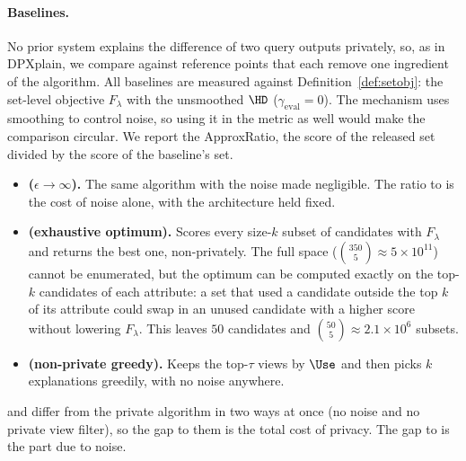 \paragraph{Baselines.}
No prior system explains the difference of two query outputs privately, so, as in DPXplain, we compare against reference points that each remove one ingredient of the algorithm.
All baselines are measured against Definition~\ref{def:setobj}: the set-level objective $F_\lambda$ with the unsmoothed $\HD$ ($\gamma_{\mathrm{eval}}=0$).
The mechanism uses smoothing to control noise, so using it in the metric as well would make the comparison circular.
We report the ApproxRatio, the score of the released set divided by the score of the baseline's set.
\begin{itemize}[leftmargin=*,itemsep=1pt,topsep=2pt]
  \item \textbf{\Bone{} ($\epsilon\to\infty$).} The same algorithm with the noise made negligible. The ratio to \Bone{} is the cost of noise alone, with the architecture held fixed.
  \item \textbf{\Btwo{} (exhaustive optimum).} Scores every size-$k$ subset of candidates with $F_\lambda$ and returns the best one, non-privately. The full space ($\binom{350}{5}\approx5\times10^{11}$) cannot be enumerated, but the optimum can be computed exactly on the top-$k$ candidates of each attribute: a set that used a candidate outside the top $k$ of its attribute could swap in an unused candidate with a higher score without lowering $F_\lambda$. This leaves $50$ candidates and $\binom{50}{5}\approx2.1\times10^{6}$ subsets.
  \item \textbf{\Bthree{} (non-private greedy).} Keeps the top-$\tau$ views by $\Use$ and then picks $k$ explanations greedily, with no noise anywhere.
\end{itemize}
\Btwo{} and \Bthree{} differ from the private algorithm in two ways at once (no noise and no private view filter), so the gap to them is the total cost of privacy. The gap to \Bone{} is the part due to noise.

